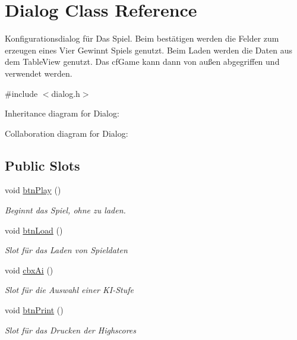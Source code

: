 \hypertarget{class_dialog}{\section{Dialog Class Reference}
\label{class_dialog}
}


Konfigurationsdialog für Das Spiel. Beim bestätigen werden die Felder zum erzeugen eines Vier Gewinnt Spiels genutzt. Beim Laden werden die Daten aus dem Table\-View genutzt. Das cf\-Game kann dann von außen abgegriffen und verwendet werden.  




{\ttfamily \#include $<$dialog.\-h$>$}



Inheritance diagram for Dialog\-:


Collaboration diagram for Dialog\-:
\subsection*{Public Slots}
\begin{DoxyCompactItemize}
\item 
void \hyperlink{class_dialog_a457f4804c42085dbb16bfb31c706a40f}{btn\-Play} ()
\begin{DoxyCompactList}\small\item\em Beginnt das Spiel, ohne zu laden. \end{DoxyCompactList}\item 
void \hyperlink{class_dialog_a419f7ab4d550b95154425e0cbe350cb5}{btn\-Load} ()
\begin{DoxyCompactList}\small\item\em Slot für das Laden von Spieldaten \end{DoxyCompactList}\item 
void \hyperlink{class_dialog_a75d078be0df9c62228d85ea8c5dabd5c}{cbx\-Ai} ()
\begin{DoxyCompactList}\small\item\em Slot für die Auswahl einer K\-I-\/\-Stufe \end{DoxyCompactList}\item 
void \hyperlink{class_dialog_a3c381c2667b6b17af6010a581995c593}{btn\-Print} ()
\begin{DoxyCompactList}\small\item\em Slot für das Drucken der Highscores \end{DoxyCompactList}\end{DoxyCompactItemize}
